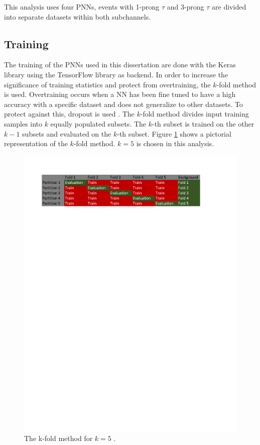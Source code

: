 			This analysis uses four \gls{PNN}s, events with 1-prong $\tau$ and 3-prong $\tau$ are divided into separate datasets within both subchannels.

		\subsection{Training}\label{ssec:training}
			The training of the \gls{PNN}s used in this dissertation are done with the Keras \cite{keras} library using the TensorFlow \cite{tensorflow2015-whitepaper} library as backend. In order to increase the significance of training statistics and protect from overtraining, the $k$-fold method is used. Overtraining occurs when a NN has been fine tuned to have a high accuracy with a specific dataset and does not generalize to other datasets. To protect against this, dropout is used \cite{dropout}. The $k$-fold method divides input training samples into $k$ equally populated subsets. The $k$-th subset is trained on the other $k-1$ subsets and evaluated on the $k$-th subset. Figure \ref{fig:k-fold-diagram} shows a pictorial representation of the $k$-fold method. $k=5$ is chosen in this analysis.

			\begin{figure}	
				\begin{center}
					\includegraphics[width=.75\textwidth,keepaspectratio=true]{chapters/chapter6_HPlus/images/kFoldDiagram_noValid.pdf}
				\end{center}
				\caption{The k-fold method for $k=5$ \cite{Burghgrave:2018uwq}.}
				\label{fig:k-fold-diagram}
			\end{figure}	

